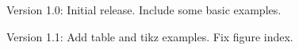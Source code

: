 Version 1.0: Initial release. Include some basic examples.

Version 1.1: Add table and tikz examples. Fix figure index. 